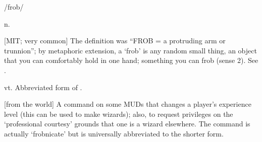  /frob/

\begin{inparaenum}
	\item n.

		[MIT; very common] The  definition was ``FROB = a protruding arm or trunnion''; by metaphoric extension, a `frob'
		is any random small thing, an object that you can comfortably hold in one hand; something you can frob (sense 2). See
		.
	\item vt. Abbreviated form of .
	\item {[}from the  world] A command on some MUDs that changes a player's experience level (this can be used to make
		wizards); also, to request  privileges on the `professional courtesy' grounds that one is a wizard elsewhere. The
		command is actually `frobnicate' but is universally abbreviated to the shorter form.
\end{inparaenum}

